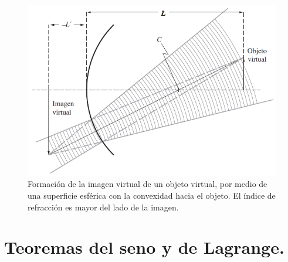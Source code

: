 \documentclass[14pt]{extarticle}
\begin{document}
\begin{figure}[H]
    \centering
    \includegraphics[scale=0.75]{Imagenes/Optica_Geometrica_12.png}
    \caption{Formación de la imagen virtual de un objeto virtual, por medio de una superficie esférica con la convexidad hacia el objeto. El índice de refracción es mayor del lado de la imagen.}
    \label{fig:figura_16}
\end{figure}

\section{Teoremas del seno y de Lagrange.}
\end{document}
